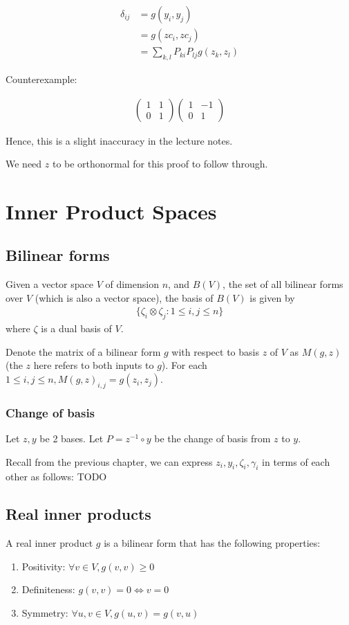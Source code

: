 \documentclass{article}
\begin{document}
\begin{align*}
\delta_{ij} &= g(y_i,y_j)\\&=g(zc_i, zc_j) \\&= \sum_{k,l}P_{ki}P_{lj}g(z_k,z_l)
\end{align*}

Counterexample:

\begin{align*}
\begin{pmatrix}
1 & 1\\
0 & 1 
\end{pmatrix}
\begin{pmatrix}
1 & -1\\
0 & 1 
\end{pmatrix}
\end{align*}

Hence, this is a slight inaccuracy in the lecture notes.

We need $z$ to be orthonormal for this proof to follow through.



\section{Inner Product Spaces}
\subsection{Bilinear forms}
Given a vector space $V$ of dimension $n$, and $B(V)$, the set of all bilinear forms over $V$ (which is also a vector space), the basis of $B(V)$ is given by
\begin{align*}
	\{\zeta_i\otimes \zeta_j: 1\leq i,j\leq n\}
\end{align*} 
where $\zeta$ is a dual basis of $V$.

Denote the matrix of a bilinear form $g$ with respect to basis $z$ of $V$ as $M(g, z)$ (the $z$ here refers to both inputs to $g$).
For each $1\leq i,j\leq n, M(g,z)_{i,j}=g(z_i,z_j)$.

\subsubsection{Change of basis}
Let $z,y$ be 2 bases. Let $P=z^{-1}\circ y$ be the change of basis from $z$ to $y$.

Recall from the previous chapter, we can express $z_i,y_i,\zeta_i,\gamma_i$ in terms of each other as follows:
TODO


\subsection{Real inner products}
A real inner product $g$ is a bilinear form that has the following properties:
\begin{enumerate}
	\item Positivity: $\forall v\in V, g(v,v)\geq 0$
	\item Definiteness: $g(v,v)=0\iff v=0$
	\item Symmetry: $\forall u,v\in V, g(u,v)=g(v,u)$
\end{enumerate}
\end{document}
